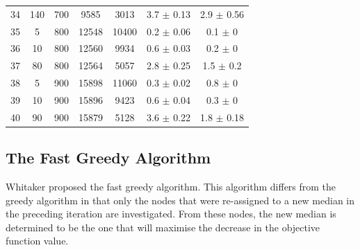 \documentclass[11pt]{article}
\newcommand{\np}{\newpage}
\begin{document}
\begin{table}[]
{\begin{tabular}{ccccccc}
				34 & 140 & 700 & 9585 & 3013 & 3.7 $\pm$ 0.13 & 2.9 $\pm$ 0.56 \\
				\rowcolor[HTML]{EFEFEF} 
				35 & 5 & 800 & 12548 & 10400 & 0.2 $\pm$ 0.06 & 0.1 $\pm$ 0 \\
				36 & 10 & 800 & 12560 & 9934 & 0.6 $\pm$ 0.03 & 0.2 $\pm$ 0 \\
				37 & 80 & 800 & 12564 & 5057 & 2.8 $\pm$ 0.25 & 1.5 $\pm$ 0.2 \\
				\rowcolor[HTML]{EFEFEF} 
				38 & 5 & 900 & 15898 & 11060 & 0.3 $\pm$ 0.02 & 0.8 $\pm$ 0 \\
				\rowcolor[HTML]{EFEFEF} 
				39 & 10 & 900 & 15896 & 9423 & 0.6 $\pm$ 0.04 & 0.3 $\pm$ 0 \\
				\rowcolor[HTML]{EFEFEF} 
				40 & 90 & 900 & 15879 & 5128 & 3.6 $\pm$ 0.22 & 1.8 $\pm$ 0.18
			\end{tabular}%
		}
	\end{table}
	
	\np
	\subsection{The Fast Greedy Algorithm}\label{fastgreedyalgo}
	Whitaker \cite{WHIT83}  proposed the fast greedy algorithm. This algorithm differs from the greedy algorithm in that only the nodes that were re-assigned to a new median in the preceding iteration are investigated.  From these nodes, the new median is determined to be the one that will maximise the decrease in the objective function value.
	
\end{document}
